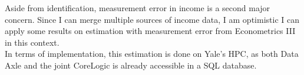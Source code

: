 \documentclass[fleqn,10pt]{olplainarticle}
\begin{document}
Aside from identification, measurement error in income is a second major concern. Since I can merge multiple sources of income data, I am optimistic I can apply some results on estimation with measurement error from Econometrics III in this context.\\
In terms of implementation, this estimation is done on Yale's HPC, as both Data Axle and the joint CoreLogic is already accessible in a SQL database.\\



\end{document}
